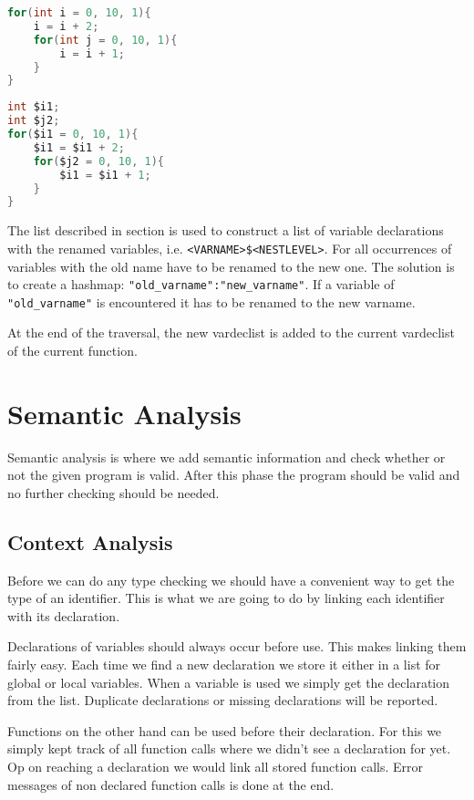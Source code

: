 \documentclass[a4paper]{article}
\begin{document}
\begin{lstlisting}[language=C]
for(int i = 0, 10, 1){
    i = i + 2;
    for(int j = 0, 10, 1){
        i = i + 1;
    }
}
\end{lstlisting}
\begin{lstlisting}[language=C]
int $i1;
int $j2;
for($i1 = 0, 10, 1){
    $i1 = $i1 + 2;
    for($j2 = 0, 10, 1){
        $i1 = $i1 + 1;
    }
}
\end{lstlisting}

The list described in section %
is used to construct a list of variable declarations with the renamed
variables, i.e. \texttt{<VARNAME>\$<NESTLEVEL>}. For all occurrences of variables with
the old name have to be renamed to the new one. The solution is to create a
hashmap: \texttt{"old\_varname":"new\_varname"}. If a variable of
\texttt{"old\_varname"} is encountered it has to be renamed to the new varname.

At the end of the traversal, the new vardeclist is added to the current
vardeclist of the current function.

\section{Semantic Analysis}
Semantic analysis is where we add semantic information and check whether or not
the given program is valid. After this phase the program should be valid and no
further checking should be needed.

\subsection{Context Analysis}
Before we can do any type checking we should have a convenient way to get the
type of an identifier. This is what we are going to do by linking each
identifier with its declaration.

Declarations of variables should always occur before use. This makes linking
them fairly easy. Each time we find a new declaration we store it either in a list
for global or local variables. When a variable is used we simply get the
declaration from the list. Duplicate declarations or missing declarations will
be reported.

Functions on the other hand can be used before their declaration. For this we
simply kept track of all function calls where we didn't see a declaration for
yet. Op on reaching a declaration we would link all stored function calls. Error
messages of non declared function calls is done at the end.
\end{document}
